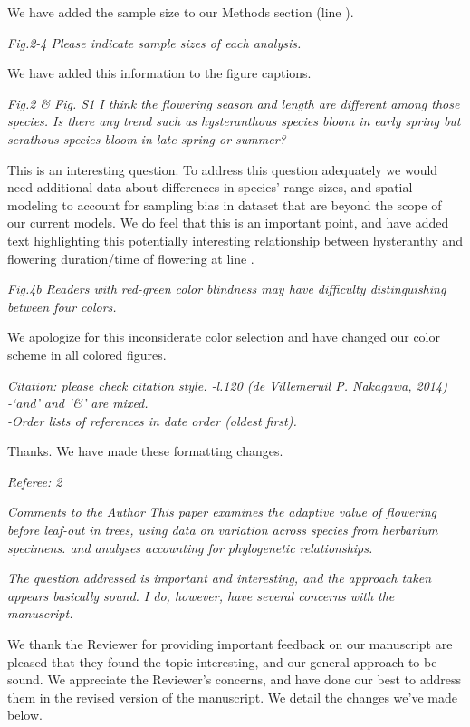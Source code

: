 \documentclass{article}[12pt]
\begin{document}
We have added the sample size to our Methods section (line ).

\emph{Fig.2-4 Please indicate sample sizes of each analysis.}

We have added this information to the figure captions.

\emph{Fig.2 & Fig. S1 I think the flowering season and length are different among those species. Is there any trend such as hysteranthous species bloom in early spring but serathous species bloom in late spring or summer?}

This is an interesting question. To address this question adequately we would need additional data about differences in species' range sizes, and spatial modeling to account for sampling bias in dataset that are beyond the scope of our current models. We do feel that this is an important point, and have added text highlighting this potentially interesting relationship between hysteranthy and flowering duration/time of flowering at line .

\emph{Fig.4b Readers with red-green color blindness may have difficulty distinguishing between four colors.}

We apologize for this inconsiderate color selection and have changed our color scheme in all colored figures.

\emph{Citation: please check citation style.
-l.120 (de Villemeruil P. Nakagawa, 2014)\\
-‘and’ and ‘&’ are mixed.\\
-Order lists of references in date order (oldest first).}

Thanks. We have made these formatting changes.

\emph{Referee: 2}

\emph{Comments to the Author}
\emph{This paper examines the adaptive value of flowering before leaf-out in trees, using data on variation across species from herbarium specimens. and analyses accounting for phylogenetic relationships.}

\emph{The question addressed is important and interesting, and the approach taken appears basically sound. I do, however, have several concerns with the manuscript.}

We thank the Reviewer for providing important feedback on our manuscript are pleased that they found the topic interesting, and our general approach to be sound. We appreciate the  Reviewer's concerns, and have done our best to address them in the revised version of the manuscript. We detail the changes we've made below.
\end{document}
